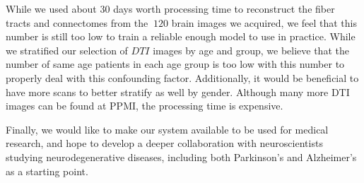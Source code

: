 While we used about $30$ days worth processing time to reconstruct the fiber tracts and connectomes from the $~120$ brain images we acquired, we feel that this number is still too low to train a reliable enough model to use in practice. While we stratified our selection of $DTI$ images by age and group, we believe that the number of same age patients in each age group is too low with this number to properly deal with this confounding factor. Additionally, it would be beneficial to have more scans to better stratify as well by gender. Although many more DTI images can be found at PPMI, the processing time is expensive. 

Finally, we would like to make our system available to be used for medical research, and hope to develop a deeper collaboration with neuroscientists studying neurodegenerative diseases, including both Parkinson's and Alzheimer's as a starting point.